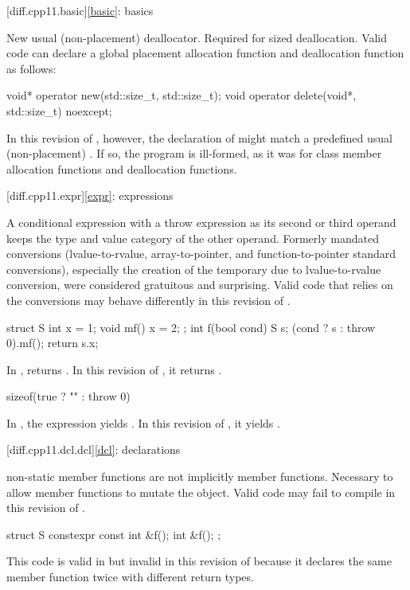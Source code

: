 [diff.cpp11.basic]{\ref*{basic}: basics}

\change
New usual (non-placement) deallocator.
\rationale
Required for sized deallocation.
\effect
Valid \CppXI{} code can declare a global placement allocation function and
deallocation function as follows:
\begin{codeblock}
void* operator new(std::size_t, std::size_t);
void operator delete(void*, std::size_t) noexcept;
\end{codeblock}
In this revision of \Cpp{}, however, the declaration of 
might match a predefined usual (non-placement)
. If so, the
program is ill-formed, as it was for class member allocation functions and
deallocation functions.

[diff.cpp11.expr]{\ref*{expr}: expressions}

\change
A conditional expression with a throw expression as its second or third
operand keeps the type and value category of the other operand.
\rationale
Formerly mandated conversions (lvalue-to-rvalue,
array-to-pointer, and function-to-pointer
standard conversions), especially the creation of the temporary due to
lvalue-to-rvalue conversion, were considered gratuitous and surprising.
\effect
Valid \CppXI{} code that relies on the conversions may behave differently
in this revision of \Cpp{}.
\begin{example}
\begin{codeblock}
struct S {
  int x = 1;
  void mf() { x = 2; }
};
int f(bool cond) {
  S s;
  (cond ? s : throw 0).mf();
  return s.x;
}
\end{codeblock}
In \CppXI{},  returns . In this revision of \Cpp{},
it returns .
\begin{codeblock}
sizeof(true ? "" : throw 0)
\end{codeblock}
In \CppXI{}, the expression yields . In this
revision of \Cpp{}, it yields .
\end{example}

[diff.cpp11.dcl.dcl]{\ref*{dcl}: declarations}

\change
{} non-static member functions are not implicitly
 member functions.
\rationale
Necessary to allow  member functions to mutate
the object.
\effect
Valid \CppXI{} code may fail to compile in this revision of \Cpp{}.
\begin{example}
\begin{codeblock}
struct S {
  constexpr const int &f();
  int &f();
};
\end{codeblock}
This code is valid in \CppXI{}
but invalid in this revision of \Cpp{} because it declares the same member
function twice with different return types.
\end{example}

